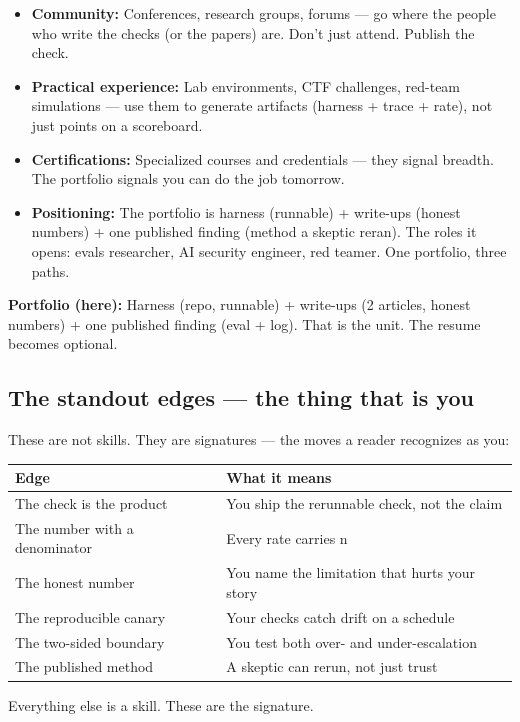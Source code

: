 \begin{itemize}
\item \textbf{Community:} Conferences, research groups, forums — go where the people who write the checks (or the papers) are. Don't just attend. Publish the check.
\item \textbf{Practical experience:} Lab environments, CTF challenges, red-team simulations — use them to generate artifacts (harness + trace + rate), not just points on a scoreboard.
\item \textbf{Certifications:} Specialized courses and credentials — they signal breadth. The portfolio signals you can do the job tomorrow.
\item \textbf{Positioning:} The portfolio is harness (runnable) + write-ups (honest numbers) + one published finding (method a skeptic reran). The roles it opens: evals researcher, AI security engineer, red teamer. One portfolio, three paths.
\end{itemize}

\begin{defbox}
\textbf{Portfolio (here):} Harness (repo, runnable) + write-ups (2 articles, honest numbers) + one published finding (eval + log). That is the unit. The resume becomes optional.
\end{defbox}

\subsection{The standout edges — the thing that is you}
These are not skills. They are signatures — the moves a reader recognizes as you:

\begin{center}
\begin{tabularx}{\linewidth}{lX}
\toprule
Edge & What it means \\
\midrule
The check is the product & You ship the rerunnable check, not the claim \\
The number with a denominator & Every rate carries n \\
The honest number & You name the limitation that hurts your story \\
The reproducible canary & Your checks catch drift on a schedule \\
The two-sided boundary & You test both over- and under-escalation \\
The published method & A skeptic can rerun, not just trust \\
\bottomrule
\end{tabularx}
\end{center}
Everything else is a skill. These are the signature.

